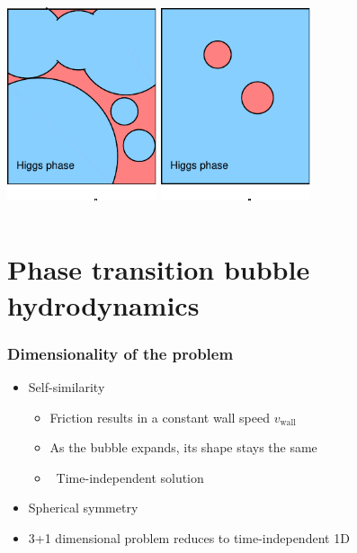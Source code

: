 \begin{frame}
\begin{columns}
\begin{column}{0.4\textwidth}
        \includegraphics[width=0.33\textwidth]{../fig/HiggsBubble2}%
        \includegraphics[width=0.33\textwidth]{../fig/HiggsBubble3}
    \end{column}
    \end{columns}
\end{frame}

\section{Phase transition bubble hydrodynamics}

\begin{frame}
    \frametitle{Dimensionality of the problem}
    \begin{itemize}
        \item Self-similarity
        \begin{itemize}
            \item Friction results in a constant wall speed $v_\text{wall}$
            \item As the bubble expands, its shape stays the same
            \item \textrightarrow \ Time-independent solution
        \end{itemize}
        \item Spherical symmetry
        \item 3+1 dimensional problem reduces to time-independent 1D
    \end{itemize}
\end{frame}

